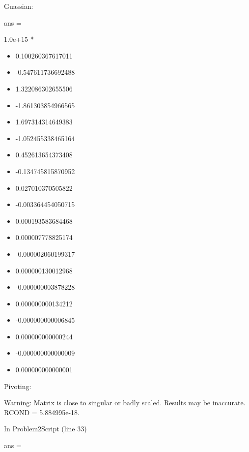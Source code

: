 \documentclass[]{article}
\providecommand{\tightlist}{%
  \setlength{\itemsep}{0pt}\setlength{\parskip}{0pt}}
\begin{document}
Guassian:

ans =

1.0e+15 *

\begin{itemize}
\tightlist
\item
  0.100260367617011
\item
  -0.547611736692488
\item
  1.322086302655506
\item
  -1.861303854966565
\item
  1.697314314649383
\item
  -1.052455338465164
\item
  0.452613654373408
\item
  -0.134745815870952
\item
  0.027010370505822
\item
  -0.003364454050715
\item
  0.000193583684468
\item
  0.000007778825174
\item
  -0.000002060199317
\item
  0.000000130012968
\item
  -0.000000003878228
\item
  0.000000000134212
\item
  -0.000000000006845
\item
  0.000000000000244
\item
  -0.000000000000009
\item
  0.000000000000001
\end{itemize}

Pivoting:

Warning: Matrix is close to singular or badly scaled. Results may be
inaccurate. RCOND = 5.884995e-18.

In Problem2Script (line 33)

ans =
\end{document}
